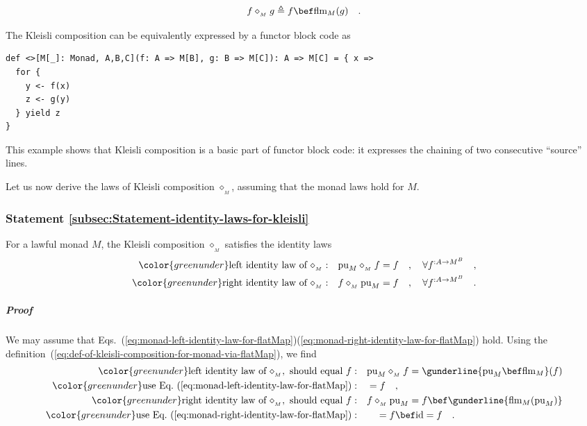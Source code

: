 ~\vspace{-0.8\baselineskip}
\begin{equation}
f\diamond_{_{M}}g\triangleq f\bef\text{flm}_{M}(g)\quad.\label{eq:def-of-kleisli-composition-for-monad-via-flatMap}
\end{equation}
\vspace{-0.5\baselineskip}

The Kleisli composition can be equivalently expressed by a functor
block code as

\begin{lstlisting}[mathescape=true]
def <>[M[_]: Monad, A,B,C](f: A => M[B], g: B => M[C]): A => M[C] = { x =>
  for {
    y <- f(x)
    z <- g(y)
  } yield z
}
\end{lstlisting}

This example shows that Kleisli composition is a basic part of functor
block code: it expresses the chaining of two consecutive \textsf{``}source\textsf{''}
lines.

Let us now derive the laws of Kleisli composition $\diamond_{_{M}}$,
assuming that the monad laws hold for $M$. 

\subsubsection{Statement \label{subsec:Statement-identity-laws-for-kleisli}\ref{subsec:Statement-identity-laws-for-kleisli}}

For a lawful monad $M$, the Kleisli composition $\diamond_{_{M}}$
satisfies the identity laws
\begin{align}
{\color{greenunder}\text{left identity law of }\diamond_{_{M}}:}\quad & \text{pu}_{M}\diamond_{_{M}}f=f\quad,\quad\forall f^{:A\rightarrow M^{B}}\quad,\label{eq:kleisli-left-identity-law}\\
{\color{greenunder}\text{right identity law of }\diamond_{_{M}}:}\quad & f\diamond_{_{M}}\text{pu}_{M}=f\quad,\quad\forall f^{:A\rightarrow M^{B}}\quad.\label{eq:kleisli-right-identity-law}
\end{align}


\subparagraph{Proof}

We may assume that Eqs.~(\ref{eq:monad-left-identity-law-for-flatMap})\textendash (\ref{eq:monad-right-identity-law-for-flatMap})
hold. Using the definition~(\ref{eq:def-of-kleisli-composition-for-monad-via-flatMap}),
we find
\begin{align*}
{\color{greenunder}\text{left identity law of }\diamond_{_{M}},\text{ should equal }f:}\quad & \text{pu}_{M}\diamond_{_{M}}f=\gunderline{\text{pu}_{M}\bef\text{flm}_{M}}(f)\\
{\color{greenunder}\text{use Eq.~(\ref{eq:monad-left-identity-law-for-flatMap})}:}\quad & =f\quad,\\
{\color{greenunder}\text{right identity law of }\diamond_{_{M}},\text{ should equal }f:}\quad & f\diamond_{_{M}}\text{pu}_{M}=f\bef\gunderline{\text{flm}_{M}(\text{pu}_{M})}\\
{\color{greenunder}\text{use Eq.~(\ref{eq:monad-right-identity-law-for-flatMap})}:}\quad & \quad=f\bef\text{id}=f\quad.
\end{align*}

